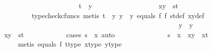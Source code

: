 \begin{isabellebody}
\ \ \ \ \ \ \ \ \ \ \ \ \ \ \ \isamarkupfalse%
\isanewline
\ \ \ \ \ \ \ \ \ \ \ \ \ \ \ \ \ \isamarkupfalse%
\ {\isachardoublequoteopen}t\ {\isasymnoteq}\ y{}{\isachardoublequoteclose}\isanewline
\ \ \ \ \ \ \ \ \ \ \ \ \ \ \ \ \ \isamarkupfalse%
\ {\isachardoublequoteopen}{\isasymlangle}x{\isacharcomma}{\kern0pt}y{\isasymrangle}\ {\isacharequal}{\kern0pt}\ {\isasymlangle}s{\isacharcomma}{\kern0pt}t{\isasymrangle}{\isachardoublequoteclose}\isanewline
\ \ \ \ \ \ \ \ \ \ \ \ \ \ \ \ \ \ \ \isamarkupfalse%
\ {\isacharparenleft}{\kern0pt}typecheck{\isacharunderscore}{\kern0pt}cfuncs{\isacharcomma}{\kern0pt}\ metis\ {\isacartoucheopen}t\ {\isasymnoteq}\ y{}{\isacartoucheclose}\ {\isacartoucheopen}y\ {\isasymnoteq}\ y{}{\isacartoucheclose}\ equals\ f{}\ f{}\ st{\isacharunderscore}{\kern0pt}def\ xy{\isacharunderscore}{\kern0pt}def{\isacharparenright}{\kern0pt}\isanewline
\ \ \ \ \ \ \ \ \ \ \ \ \ \ \ \isamarkupfalse%
\isanewline
\ \ \ \ \ \ \ \ \ \ \ \ \ \isamarkupfalse%
\isanewline
\ \ \ \ \ \ \ \ \ \ \ \isamarkupfalse%
\isanewline
\ \ \ \ \ \ \ \ \ \isamarkupfalse%
\isanewline
\ \ \ \ \ \ \ \ \ \ \ \isamarkupfalse%
\ {\isachardoublequoteopen}y\ {\isasymnoteq}\ y{}{\isachardoublequoteclose}\isanewline
\ \ \ \ \ \ \ \ \ \ \ \isamarkupfalse%
\ {\isachardoublequoteopen}{\isasymlangle}x{\isacharcomma}{\kern0pt}y{\isasymrangle}\ {\isacharequal}{\kern0pt}\ {\isasymlangle}s{\isacharcomma}{\kern0pt}t{\isasymrangle}{\isachardoublequoteclose}\isanewline
\ \ \ \ \ \ \ \ \ \ \ \isamarkupfalse%
{\isacharparenleft}{\kern0pt}cases\ {\isachardoublequoteopen}s\ {\isacharequal}{\kern0pt}\ x{\isachardoublequoteclose}{\isacharcomma}{\kern0pt}\ auto{\isacharparenright}{\kern0pt}\isanewline
\ \ \ \ \ \ \ \ \ \ \ \ \ \isamarkupfalse%
\ {\isachardoublequoteopen}s\ {\isacharequal}{\kern0pt}\ x\ {\isasymLongrightarrow}\ {\isasymlangle}x{\isacharcomma}{\kern0pt}y{\isasymrangle}\ {\isacharequal}{\kern0pt}\ {\isasymlangle}x{\isacharcomma}{\kern0pt}t{\isasymrangle}{\isachardoublequoteclose}\isanewline
\ \ \ \ \ \ \ \ \ \ \ \ \ \ \ \isamarkupfalse%
\ {\isacharparenleft}{\kern0pt}metis\ equals{}\ f{}\ t{\isacharunderscore}{\kern0pt}type\ x{\isacharunderscore}{\kern0pt}type\ y{\isacharunderscore}{\kern0pt}type{\isacharparenright}{\kern0pt}\isanewline
\ \ \ \ \ \ \ \ \ \ \ \ \ \isamarkupfalse%

\end{isabellebody}
